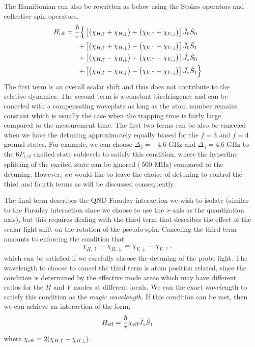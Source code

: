 \documentclass[preprint,aps,pra,onecolumn]{revtex4-1} %
\begin{document}
The Hamiltonian can also be rewritten as below using the Stokes operators and collective spin operators.
\begin{align}
H_{\rm eff} 
=\frac{\hbar}{\tau} \Big\{ & \left[ \big( \chi_{H,\uparrow} + \chi_{H,\downarrow}\big) + \big(\chi_{V,\uparrow} + \chi_{V,\downarrow}\big) \right] \hat{J}_0 \hat{S}_0 \nonumber \\
+ & \left[ \big( \chi_{H, \uparrow} + \chi_{H,\downarrow}\big) - \big( \chi_{V,\uparrow} + \chi_{V,\downarrow} \big)\right]  \hat{J}_0 \hat{S}_1 \nonumber \\
+ & \left[ \big( \chi_{H,\uparrow} - \chi_{H,\downarrow}\big) + \big(\chi_{V,\uparrow} - \chi_{V,\downarrow} \big) \right] \hat{J}_z \hat{S}_0 \nonumber \\
+ & \left[ \big( \chi_{H,\uparrow} - \chi_{H,\downarrow}\big) - \big(\chi_{V,\uparrow} - \chi_{V,\downarrow} \big) \right]  \hat{J}_z \hat{S}_1\Big\}
\end{align}
The first term is an overall scalar shift and thus does not contribute to the relative dynamics.  The second term is a constant birefringence and can be canceled with a compensating waveplate as long as the atom number remains constant which is usually the case when the trapping time is fairly large compared to the measurement time. The first two terms can be also be canceled when we have the detuning approximately equally biased for the $ f=3 $ and $ f=4 $ ground states. 
For example, we  can choose $ \Delta_3=-4.6 $ GHz and $ \Delta_4=4.6 $ GHz to the $ 6P_{1/2} $ excited state sublevels to satisfy this condition, where the hyperfine splitting of the excited state can be ignored ($ ~500 $ MHz) compared to the detuning. However, we would like to leave the choice of detuning to control the third and fourth terms as will be discussed consequently. 

The final term describes the QND Faraday interaction we wish to isolate (similar to the Faraday interaction since we choose to use the $ x $-axis as the quantization axis), but this requires dealing with the third term that describes the effect of the scalar light shift on the rotation of the pseudo-spin.  Canceling the third term amounts to enforcing the condition that
	\begin{align}
		\chi_{H,\uparrow} - \chi_{H,\downarrow} = \chi_{V,\downarrow} - \chi_{V,\uparrow} ,
	\end{align}
which can be satisfied if we carefully choose the detuning of the probe light. The wavelength to choose to cancel the third term is atom position related, since the condition is determined by the effective mode areas which may have different ratios for the $ H $ and $ V $ modes at different locals. We can the exact wavelength to satisfy this condition as the \textit{magic wavelength}. If this condition can be met, then we can achieve an interaction of the form,
	\begin{align}
		H_{\rm eff} = \frac{\hbar}{\tau} \chi_{\rm eff} \hat{J}_z \hat{S}_1
	\end{align}
where $\chi_{\rm eff} = 2(\chi_{H,\uparrow} - \chi_{H,\downarrow})$.  
\end{document}
